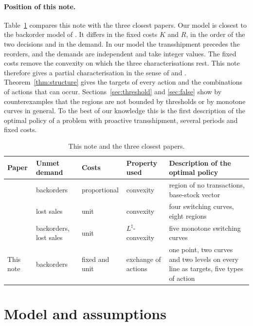 \documentclass[11pt]{article}
\theoremstyle{definition}
\begin{document}
\paragraph{Position of this note.}
Table~\ref{tab:position} compares this note with the three closest papers. Our model is closest to the backorder model of \citet{xu2023optimal}. It differs in the fixed costs $K$ and $R$, in the order of the two decisions and in the demand. In our model the transshipment precedes the reorders, and the demands are independent and take integer values. The fixed costs remove the convexity on which the three characterisations rest. This note therefore gives a partial characterisation in the sense of \citet{shaoxiang1996xy} and \citet{gallego2000capacitated}. Theorem~\ref{thm:structure} gives the targets of every action and the combinations of actions that can occur. Sections~\ref{sec:threshold} and \ref{sec:false} show by counterexamples that the regions are not bounded by thresholds or by monotone curves in general. To the best of our knowledge this is the first description of the optimal policy of a problem with proactive transshipment, several periods and fixed costs.

\begin{table}[h]
\centering
\small
\caption{This note and the three closest papers.}\label{tab:position}
\begin{tabular}{p{2.9cm}p{1.9cm}p{2.0cm}p{2.4cm}p{4.3cm}}
\toprule
Paper & Unmet demand & Costs & Property used & Description of the optimal policy \\
\midrule
\citet{karmarkar1981multiperiod} & backorders & proportional & convexity & region of no transactions, base-stock vector \\
\citet{abouee2015optimal} & lost sales & unit & convexity & four switching curves, eight regions \\
\citet{xu2023optimal} & backorders, lost sales & unit & $L^{\natural}$-convexity & five monotone switching curves \\
This note & backorders & fixed and unit & exchange of actions & one point, two curves and two levels on every line as targets, five types of action \\
\bottomrule
\end{tabular}
\end{table}

\section{Model and assumptions}\label{sec:model}
\end{document}
